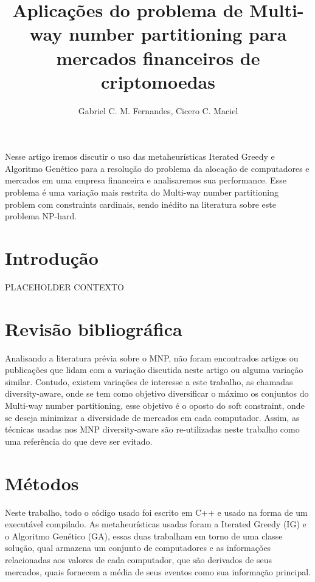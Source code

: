 \documentclass[12pt]{article}
\title{Aplicações do problema de Multi-way number partitioning para mercados financeiros de criptomoedas}
\author{Gabriel C. M. Fernandes\inst{1}, Cicero C. Maciel \inst{1}}
\begin{document}
 

\maketitle


     
\begin{resumo} 

Nesse artigo iremos discutir o uso das metaheurísticas Iterated Greedy e Algoritmo Genético para a resolução do problema da alocação de computadores e mercados em uma empresa financeira e analisaremos sua performance. Esse problema é uma variação mais restrita do Multi-way number partitioning problem com constraints cardinais, sendo inédito na literatura sobre este problema NP-hard.



\end{resumo}


\section{Introdução}


PLACEHOLDER CONTEXTO


\section{Revisão bibliográfica}
Analisando a literatura prévia sobre o MNP, não foram encontrados artigos ou publicações que lidam com a variação discutida neste artigo ou alguma variação similar. Contudo, existem variações de interesse a este trabalho, as chamadas diversity-aware, onde se tem como objetivo diversificar o máximo os conjuntos do Multi-way number partitioning, esse objetivo é o oposto do soft constraint, onde se deseja minimizar a diversidade de mercados em cada computador.  Assim, as técnicas usadas nos MNP  diversity-aware são re-utilizadas neste trabalho como uma referência do que deve ser evitado.

\section{Métodos}

Neste trabalho, todo o código usado foi escrito em C++ e usado na forma de um executável compilado. As metaheurísticas usadas foram a Iterated Greedy (IG) e o Algoritmo Genético (GA), essas duas trabalham em torno de uma classe solução, qual armazena um conjunto de computadores e as informações relacionadas aos valores de cada computador, que são derivados de seus mercados, quais fornecem a média de seus eventos como sua informação principal. 
\end{document}
